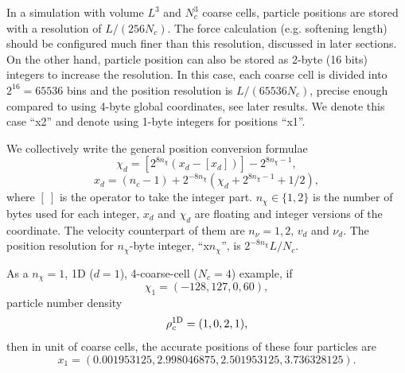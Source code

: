 \documentclass[10pt,twocolumn,preprint]{emulateapj}
\begin{document}
In a simulation with volume $L^3$ and $N_c^3$ coarse cells, particle positions are stored with a resolution of $L/(256N_c)$. The force calculation (e.g. softening length) should be configured much finer than this resolution, discussed in later sections. On the other hand, particle position can also be stored as 2-byte (16 bits) integers to increase the resolution. In this case, each coarse cell is divided into $2^{16}=65536$ bins and the position resolution is $L/(65536N_c)$, precise enough compared to using 4-byte global coordinates, see later results. We denote this case ``x2'' and denote using 1-byte integers for positions ``x1''.

We collectively write the general position conversion formulae
\begin{equation}\label{eq.chi}
	\chi_d=\left[2^{8n_\chi}(x_d-\left[x_d\right])\right]-2^{8n_\chi-1},
\end{equation}
\begin{equation}\label{eq.x}
	x_d=(n_c-1)+2^{-8n_\chi}\left(\chi_d+2^{8n_\chi-1}+1/2\right),
\end{equation}
where $[\ ]$ is the operator to take the integer part. $n_\chi\in\{1,2\}$ is the number of bytes used for each integer, $x_d$ and $\chi_d$ are floating and integer versions of the coordinate. The velocity counterpart of them are $n_\nu=1,2$, $v_d$ and $\nu_d$.
The position resolution for $n_\chi$-byte integer, ``x$n_\chi$'', is $2^{-8n_\chi}L/N_c$.

As a $n_\chi=1$, 1D ($d=1$), 4-coarse-cell ($N_c=4$) example, if $$\chi_1=(-128,127,0,60),$$ particle number density $${\rho_c^{\rm 1D}}=(1,0,2,1),$$ then in unit of coarse cells, the accurate positions of these four particles are $$x_1=(0.001953125, 2.998046875, 2.501953125, 3.736328125).$$
\end{document}
